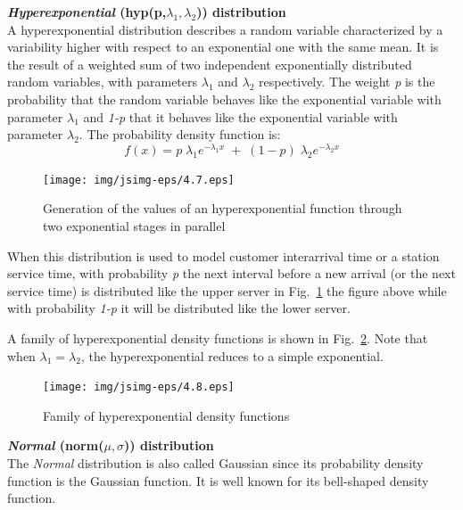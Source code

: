 \textbf{\emph{Hyperexponential} (hyp(p,$\lambda_1,\lambda_2$))
distribution}\\
A hyperexponential distribution describes a random variable
characterized by a variability higher with respect to an
exponential one with the same mean. It is the result of a weighted
sum of two independent exponentially distributed random variables,
with parameters $\lambda_1$ and $\lambda_2$ respectively. The
weight \emph{p} is the probability  that the random variable
behaves like the exponential variable with parameter $\lambda_1$
and \emph{1-p} that it behaves like the exponential variable with
parameter $\lambda_2$. The probability density function is:
\[ f(x) = p \; \lambda_1 e^{- \lambda_1 x}\; + \;
(1-p) \; \lambda_2 e^{- \lambda_2 x}
\]
\begin{figure}[htb]
    \begin{center}
        \texttt{[image: img/jsimg-eps/4.7.eps]}
    \end{center}
    \caption{Generation of the values of an hyperexponential function
    through two exponential stages in parallel}
    \label{fig:genHyper}
\end{figure}
When this distribution is used to model customer interarrival time
or a station service time, with probability \emph{p} the next
interval before a new arrival (or the next service time) is
distributed like the upper server in Fig.~\ref{fig:genHyper} the
figure above while with probability \emph{1-p} it will be
distributed like the lower server.

A family of hyperexponential density functions is shown in
Fig.~\ref{fig:famHyper}. Note that when $\lambda_1 = \lambda_2$,
the hyperexponential reduces to a simple exponential.\\

\begin{figure}[htb]
    \begin{center}
        \texttt{[image: img/jsimg-eps/4.8.eps]}
    \end{center}
    \caption{Family of hyperexponential density functions}
    \label{fig:famHyper}
\end{figure}

\textbf{\emph{Normal} (norm($\mu,\sigma$)) distribution}\\
The \emph{Normal} distribution is also called Gaussian since its
probability density function is the Gaussian function. It is well
known for its bell-shaped density function.


